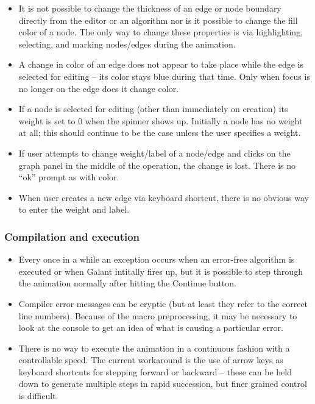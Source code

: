 \begin{itemize}

\item
It is not possible to change the thickness of an edge or node boundary directly
from the editor or an algorithm nor is it possible to change the fill color of a node.
The only way to change these properties is via highlighting, selecting, and
marking nodes/edges during the animation.

\item
A change in color of an edge does not appear to take place while the edge
is selected for editing -- its color stays blue during that time.
Only when focus is no longer on the edge does it change color.

\item If a node is selected for editing (other than immediately on creation)
  its weight is set to 0 when the spinner shows up.  Initially a node has no
  weight at all; this should continue to be the case unless the user
  specifies a weight.

\item If user attempts to change weight/label of a node/edge and clicks on
  the graph panel in the middle of the operation, the change is lost. There
  is no ``ok'' prompt as with color.

\item When user creates a new edge via keyboard shortcut, there is no obvious
  way to enter the weight and label.

\end{itemize}

\subsubsection*{Compilation and execution}

\begin{itemize}

\item Every once in a while an exception occurs when an error-free algorithm
  is executed or when Galant intitally fires up, but it is possible to step
  through the animation normally after hitting the \textsf{Continue} button.

\item
  Compiler error messages can be cryptic (but at least they refer to the correct
  line numbers). Because of the macro preprocessing, it may be necessary to look at the console to get an idea of what is causing a particular error.
  
\item
  There is no way to execute the animation in a continuous fashion with a
  controllable speed. The current workaround is the use of arrow keys as keyboard
  shortcuts for stepping forward or backward -- these can be held down to
  generate multiple steps in rapid succession, but finer grained control is
  difficult.

\end{itemize}

